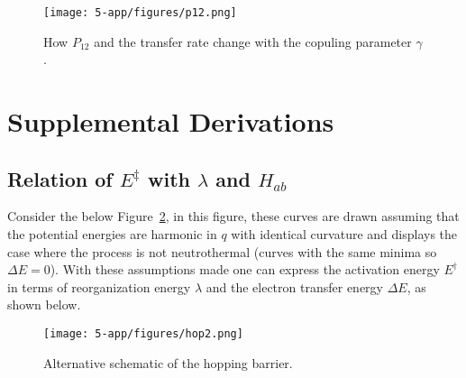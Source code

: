 \begin{figure}[H]
    \centering
    \texttt{[image: 5-app/figures/p12.png]}
    \caption{How $P_{12}$ and the transfer rate change with the copuling parameter $\gamma$.}
    \label{app:fig:p12}
\end{figure}

\section{Supplemental Derivations}

\subsection{Relation of $E^{\ddagger}$ with $\lambda$ and $H_{ab}$}
Consider the below Figure~\ref{app:fig:hop2}, in this figure, these curves are drawn assuming that the potential energies are harmonic in $q$ with identical curvature and displays the case where the process is not neutrothermal (curves with the same minima so $\Delta E = 0$). With these assumptions made one can express the activation energy $E^\dagger$ in terms of reorganization energy $\lambda$ and the electron transfer energy $\Delta E$, as shown below.

\begin{figure}[H]
    \centering
    \texttt{[image: 5-app/figures/hop2.png]}
    \caption{Alternative schematic of the hopping barrier.}
    \label{app:fig:hop2}
\end{figure}

